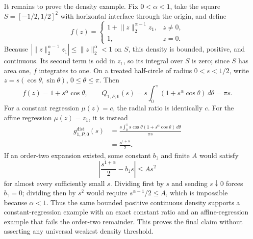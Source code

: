 It remains to prove the density example.  Fix \(0<\alpha<1\), take the square \(S=[-1/2,1/2]^2\) with horizontal interface through the origin, and define
\[
 f(z)=
 \begin{cases}
 1+\lVert z\rVert_2^{\alpha-1}z_1,&z\neq0,\\
 1,&z=0.
 \end{cases}
\]
Because \(|\lVert z\rVert_2^{\alpha-1}z_1|\leq\lVert z\rVert_2^\alpha<1\) on \(S\), this density is bounded, positive, and continuous.  Its second term is odd in \(z_1\), so its integral over \(S\) is zero; since \(S\) has area one, \(f\) integrates to one.  On a treated half-circle of radius \(0<s<1/2\), write \(z=s(\cos\theta,\sin\theta)\), \(0\leq\theta\leq\pi\).  Then
\[
 f(z)=1+s^\alpha\cos\theta,
 \qquad
 Q_{1,P,0}(s)=s\int_0^\pi(1+s^\alpha\cos\theta)\,d\theta=\pi s.
\]
For a constant regression \(\mu(z)=c\), the radial ratio is identically \(c\).  For the affine regression \(\mu(z)=z_1\), it is instead
\[
\begin{aligned}
 g^{\mathrm{dist}}_{1,P,0}(s)
 &=\frac{s\int_0^\pi s\cos\theta
 (1+s^\alpha\cos\theta)\,d\theta}{\pi s}\\
 &=\frac{s^{1+\alpha}}2.
\end{aligned}
\]
If an order-two expansion existed, some constant \(b_1\) and finite \(A\) would satisfy
\[
 \left|\frac{s^{1+\alpha}}2-b_1s\right|\leq As^2
\]
for almost every sufficiently small \(s\).  Dividing first by \(s\) and sending \(s\downarrow0\) forces \(b_1=0\); dividing then by \(s^2\) would require \(s^{\alpha-1}/2\leq A\), which is impossible because \(\alpha<1\).  Thus the same bounded positive continuous density supports a constant-regression example with an exact constant ratio and an affine-regression example that fails the order-two remainder.  This proves the final claim without asserting any universal weakest density threshold.